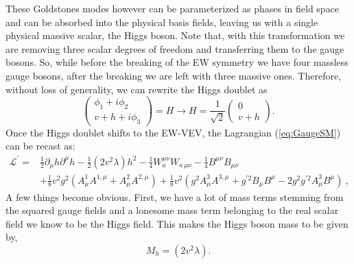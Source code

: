 \documentclass[10pt]{book}
\renewcommand{\(}{\left(}
\renewcommand{\)}{\right)}
\renewcommand{\[}{\left[}
\renewcommand{\]}{\right]}
\begin{document}
These Goldstones modes however can be parameterized as phases in field space and can be absorbed into the physical basis fields, leaving us with a single physical massive scalar, the Higgs boson. 
%
Note that, with this transformation we are removing three scalar degrees of freedom and transferring them to the gauge bosons.  %
%
%
So, while before the breaking of the EW symmetry we have four massless gauge bosons, after the breaking we are left with three massive ones.
%
%
%
Therefore, without loss of generality, we can rewrite the Higgs doublet as
%
\begin{equation}
 \begin{pmatrix}
\phi_1 + i \phi_2 \\ 
v + h + i \phi_3 
\end{pmatrix} = H  \rightarrow H =  \frac{1}{\sqrt{2}} \begin{pmatrix}
0 \\ 
v + h 
\end{pmatrix}  .
\label{shame}
\end{equation}
Once the Higgs doublet shifts to the EW-VEV, the Lagrangian (\ref{eq:GaugeSM}) can be recast as:
%
\begin{align}
\mathcal{L}^\prime = & \frac{1}{2} \partial_\mu h \partial^\mu h - \frac{1}{2} (2v^2 \lambda) h^2
 - \frac{1}{4}  W^{\mu \nu}_a W_{a \, \mu \nu}  
- \frac{1}{4}  B^{\mu \nu} B_{\mu \nu}  \nonumber \\
& + \frac{1}{8} v^2 g^2 (A^1_\mu A^{1,\mu}+ A^2_\mu A^{2,\mu}) +  \frac{1}{8} v^2  (g^2  A^3_\mu A^{3,\mu} + g^{\prime 2} B_\mu B^\mu - 2 g^2 g^{\prime 2} A^3_\mu B^\mu )  \ , 
\label{complicatedpart}
\end{align}
%
A few things become obvious. First, we have a lot of mass terms stemming from the squared gauge fields and a lonesome mass term belonging to the real scalar field we know to be the Higgs field. This makes the Higgs boson mass to be given by,
%
\begin{equation}
M_h= (2v^2 \lambda).  
\end{equation}
\end{document}
